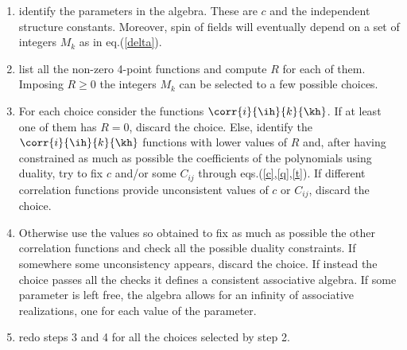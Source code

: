 \documentclass[11pt]{article}
\begin{document}
\begin{enumerate}
\item
identify the parameters in the algebra. These are $c$ and the independent
structure constants. Moreover, spin of fields will eventually depend on
a set of integers $M_k$ as in eq.(\ref{delta}).
\item
list all the non-zero 4-point functions and compute $R$ for each of them.
Imposing $R\geq 0$ the integers $M_k$ can be selected to a few possible
choices.
\item
For each choice consider the functions $\corr{i}{\ih}{k}{\kh}$. If at least
one of them has $R=0$, discard the choice. Else, identify the $\corr{i}{\ih}
{k}{\kh}$ functions with lower values of $R$ and, after having constrained
as much as possible the coefficients of the polynomials using duality,
try to fix $c$ and/or some $C_{ij}$ through eqs.(\ref{c},\ref{q},\ref{t}).
If different
correlation functions provide unconsistent values of $c$ or $C_{ij}$,
discard the choice.
\item
Otherwise use the values so obtained to fix as much as possible the other
correlation functions and check all the possible duality constraints. If
somewhere some unconsistency appears, discard the choice. If instead the
choice passes all the checks it defines a consistent associative algebra.
If some parameter is left free, the algebra allows for an infinity of
associative realizations, one for each value of the parameter.
\item
redo steps 3 and 4 for all the choices selected by step 2.
\end{enumerate}
\end{document}
